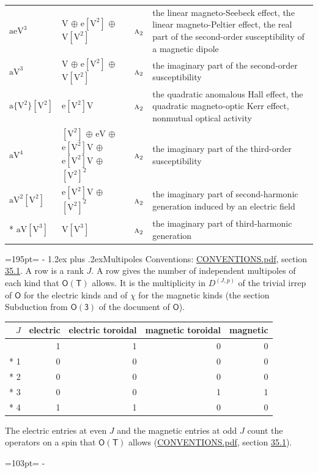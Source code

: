 \documentclass[10pt,a4paper]{article}
\makeatletter
\renewcommand\section{\@startsection{section}{1}{\z@}{-3ex plus -1ex minus -.2ex}%
  {1.2ex plus .2ex}{\normalfont\large\sffamily\bfseries\color{parttitle}}}
\newcommand{\needspace}[1]{\par\penalty-100\begingroup\dimen0=#1\relax\dimen2=\pagegoal
  \advance\dimen2-\pagetotal\ifdim\dimen0>\dimen2\relax\ifdim\dimen2>0pt\vfil\break\fi\fi
  \endgroup}
\numberwithin{equation}{section}
\newcommand{\grp}[1]{\mathsf{#1}}
\newcommand{\irr}[1]{\text{\normalfont\scshape #1}}
\newcommand{\irrJp}[2]{D^{(#1,#2)}}
\newcommand{\jahn}[1]{\mathrm{#1}}
\newlength{\fillwidth}\newlength{\cellwidth}\newlength{\colwidth}
\makeatother
\begin{document}
{\begin{longtable}{@{}lll>{\RaggedRight\arraybackslash}p{\fillwidth}@{}}
$\jahn{aeV^{3}}$ & $\jahn{V}$ $\oplus$ $\jahn{e[V^{2}]}$ $\oplus$ $\jahn{V[V^{2}]}$ & $\irr{a}_{2}$ & the linear magneto-Seebeck effect, the linear magneto-Peltier effect, the real part of the second-order susceptibility of a magnetic dipole\\
$\jahn{aV^{3}}$ & $\jahn{V}$ $\oplus$ $\jahn{e[V^{2}]}$ $\oplus$ $\jahn{V[V^{2}]}$ & $\irr{a}_{2}$ & the imaginary part of the second-order susceptibility\\
$\jahn{a\{V^{2}\}[V^{2}]}$ & $\jahn{e[V^{2}]V}$ & $\irr{a}_{2}$ & the quadratic anomalous Hall effect, the quadratic magneto-optic Kerr effect, nonmutual optical activity\\
$\jahn{aV^{4}}$ & $\jahn{[V^{2}]}$ $\oplus$ $\jahn{eV}$ $\oplus$ $\jahn{e[V^{2}]V}$ $\oplus$ $\jahn{e[V^{2}]V}$ $\oplus$ $\jahn{[V^{2}]^{2}}$ & $\irr{a}_{2}$ & the imaginary part of the third-order susceptibility\\
$\jahn{aV^{2}[V^{2}]}$ & $\jahn{e[V^{2}]V}$ $\oplus$ $\jahn{[V^{2}]^{2}}$ & $\irr{a}_{2}$ & the imaginary part of second-harmonic generation induced by an electric field\\*
$\jahn{aV[V^{3}]}$ & $\jahn{V[V^{3}]}$ & $\irr{a}_{2}$ & the imaginary part of third-harmonic generation\\
\bottomrule\end{longtable}}
\needspace{195pt}
\section{Multipoles}\label{s:multipoles}
Conventions: \href{../../CONVENTIONS.pdf}{CONVENTIONS.pdf}, section \href{../../CONVENTIONS.pdf\#conv.35.1}{35.1}.
A row is a rank $J$. \label{n:head.multipole.electric}\label{n:head.multipole.electric.toroidal}\label{n:head.multipole.magnetic.toroidal}\label{n:head.multipole.magnetic}A row gives the number of independent multipoles of each kind that $\grp{O}(\grp{T})$ allows. It is the multiplicity in $\irrJp{J}{p}$ of the trivial irrep of $\grp{O}$ for the electric kinds and of $\chi$ for the magnetic kinds (the section Subduction from $\grp{O(3)}$ of the document of \href{../../../rotation/data/pdf/O.pdf}{$\grp{O}$}).
{\small\begin{longtable}{@{}rrrrr@{}}\toprule
$J$ & electric & electric toroidal & magnetic toroidal & magnetic\\\midrule\endhead
\bottomrule\endfoot\endlastfoot
0 & 1 & 1 & 0 & 0\\*
1 & 0 & 0 & 0 & 0\\*
2 & 0 & 0 & 0 & 0\\*
3 & 0 & 0 & 1 & 1\\*
4 & 1 & 1 & 0 & 0\\
\bottomrule\end{longtable}}
The electric entries at even $J$ and the magnetic entries at odd $J$ count the operators on a spin that $\grp{O}(\grp{T})$ allows (\href{../../CONVENTIONS.pdf}{CONVENTIONS.pdf}, section \href{../../CONVENTIONS.pdf\#conv.35.1}{35.1}).
\needspace{103pt}
\end{document}
